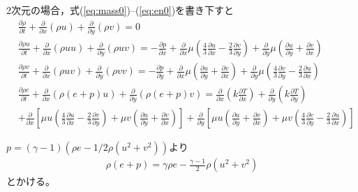 \documentclass[a4paper,10pt,fleqn]{jsarticle}
\begin{document}
2次元の場合，式(\ref{eq:mass0})--(\ref{eq:en0})を書き下すと
\begin{align}
& \frac{\partial \rho}{\partial t} + \frac{\partial}{\partial x}(\rho
 u) + \frac{\partial}{\partial y}(\rho  v) = 0 \label{eq:mass1}\\
%
& \frac{\partial \rho u}{\partial t} + \frac{\partial}{\partial x}(\rho
 u u) + \frac{\partial}{\partial y}(\rho
 u v) = -\frac{\partial p}{\partial x} + \frac{\partial
 }{\partial x} \mu \left(\frac{4}{3}\frac{\partial u}{\partial x} -
 \frac{2}{3}\frac{\partial v}{\partial y}\right) +  \frac{\partial
 }{\partial y} \mu \left(\frac{\partial u}{\partial y} +
 \frac{\partial v}{\partial x}\right) \label{eq:mom1x}\\
%
& \frac{\partial \rho v}{\partial t} + \frac{\partial}{\partial x}(\rho
 u v) + \frac{\partial}{\partial y}(\rho
 v v) = -\frac{\partial p}{\partial y} + \frac{\partial
 }{\partial x}  \mu \left(\frac{\partial u}{\partial y} +
 \frac{\partial v}{\partial x}\right) +  \frac{\partial
 }{\partial y} \mu\left(\frac{4}{3}\frac{\partial v}{\partial y} -
 \frac{2}{3}\frac{\partial u}{\partial x}\right) \label{eq:mom1y}\\
%
& \frac{\partial \rho e}{\partial t} + \frac{\partial}{\partial x}(\rho
 (e+p)u) + \frac{\partial}{\partial y}(\rho
  (e+p)v) 
= \frac{\partial}{\partial x}\left(k\frac{\partial T}{\partial
 x}\right) 
+ \frac{\partial}{\partial y}\left(k\frac{\partial T}{\partial
 y}\right) \nonumber \\
& +  \frac{\partial
 }{\partial x} \left[ \mu u \left(\frac{4}{3}\frac{\partial u}{\partial x} -
 \frac{2}{3}\frac{\partial v}{\partial y}\right) + \mu v\left( \frac{\partial u}{\partial y} +
 \frac{\partial v}{\partial x}\right)
 \right] 
+ \frac{\partial}{\partial y}\left[  \mu u \left(\frac{\partial u}{\partial y} +
 \frac{\partial v}{\partial x}\right) +  \mu v\left(\frac{4}{3}\frac{\partial v}{\partial y} -
 \frac{2}{3}\frac{\partial u}{\partial x}\right)\right] \label{eq:en1}
\end{align}

$p=(\gamma-1)(\rho e - 1/2\rho(u^2+v^2))$より
\begin{align}
 \rho(e+p)=\gamma \rho e-
\frac{\gamma-1}{2}\rho(u^2+v^2)
\end{align}
とかける。
\end{document}
